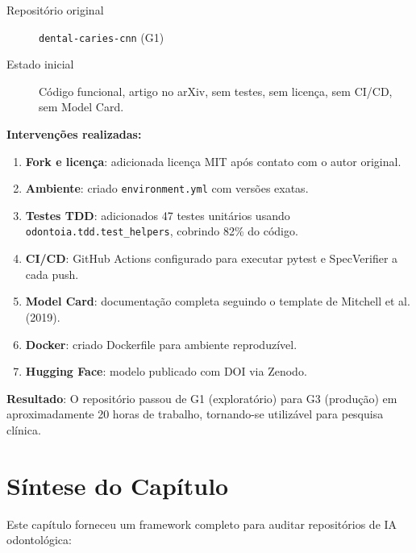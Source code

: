 \begin{description}
  \item[Repositório original] \texttt{dental-caries-cnn} (G1)
  \item[Estado inicial] Código funcional, artigo no arXiv, sem testes,
    sem licença, sem CI/CD, sem Model Card.
\end{description}

\textbf{Intervenções realizadas:}

\begin{enumerate}
  \item \textbf{Fork e licença}: adicionada licença MIT após contato com
    o autor original.
  \item \textbf{Ambiente}: criado \texttt{environment.yml} com versões exatas.
  \item \textbf{Testes TDD}: adicionados 47 testes unitários usando
    \texttt{odontoia.tdd.test\_helpers}, cobrindo 82\% do código.
  \item \textbf{CI/CD}: GitHub Actions configurado para executar pytest
    e SpecVerifier a cada push.
  \item \textbf{Model Card}: documentação completa seguindo o template
    de Mitchell et al. (2019).
  \item \textbf{Docker}: criado Dockerfile para ambiente reproduzível.
  \item \textbf{Hugging Face}: modelo publicado com DOI via Zenodo.
\end{enumerate}

\textbf{Resultado}: O repositório passou de G1 (exploratório) para G3
(produção) em aproximadamente 20 horas de trabalho, tornando-se utilizável
para pesquisa clínica.


\section{Síntese do Capítulo}

Este capítulo forneceu um framework completo para auditar repositórios
de IA odontológica:

